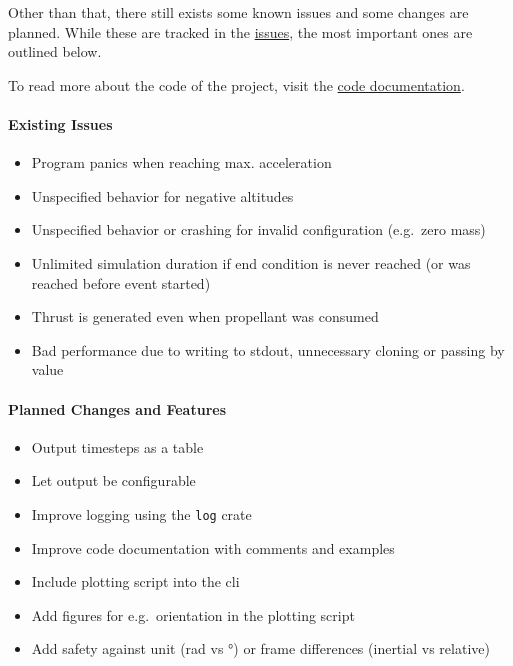 Other than that, there still exists some known issues and some changes are
planned. While these are tracked in the
\href{https://github.com/TiborVoelcker/post/issues}{issues}, the most important
ones are outlined below.

To read more about the code of the project, visit the
\href{https://tiborvoelcker.github.io/post/docs/post/index.html}{code documentation}.

\paragraph{Existing Issues}\label{existing-issues}

\begin{itemize}
  \item Program panics when reaching max. acceleration
  \item Unspecified behavior for negative altitudes
  \item Unspecified behavior or crashing for invalid configuration (e.g.~zero
        mass)
  \item Unlimited simulation duration if end condition is never reached (or was
        reached before event started)
  \item Thrust is generated even when propellant was consumed
  \item Bad performance due to writing to stdout, unnecessary cloning or passing
        by value
\end{itemize}

\paragraph{Planned Changes and Features}\label{planned-changes-and-features}

\begin{itemize}
  \item Output timesteps as a table
  \item Let output be configurable
  \item Improve logging using the \lstinline{log} crate
  \item Improve code documentation with comments and examples
  \item Include plotting script into the \gls{cli}
  \item Add figures for e.g.~orientation in the plotting script
  \item Add safety against unit (rad vs °) or frame differences (inertial vs
        relative)
\end{itemize}
